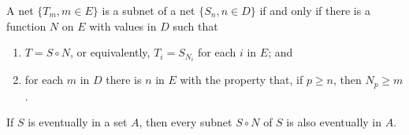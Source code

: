 A net $\{T_m, m \in E\}$ is a subnet of a net $\{S_n, n \in D\}$ if and only if there is a function $N$ on $E$ with values in $D$ such that

\begin{enumerate}
\item[(a)] $T = S \circ N$, or equivalently, $T_i = S_{N_i}$ for each $i$ in $E$; and
\item[(b)] for each $m$ in $D$ there is $n$ in $E$ with the property that, if $p \geq n$, then $N_p \geq m$.
\end{enumerate}

If $S$ is eventually in a set $A$, then every subnet $S \circ N$ of $S$ is also eventually in $A$.
